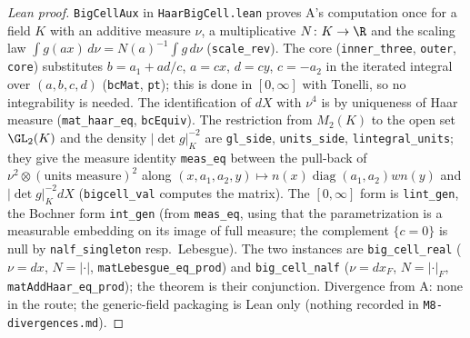 \begin{proof}[Lean proof]
\texttt{BigCellAux} in \texttt{HaarBigCell.lean} proves A's computation once for a field $K$ with an additive measure $\nu$, a multiplicative $N\colon K\to\R$ and the scaling law $\int g(ax)\,d\nu=N(a)^{-1}\int g\,d\nu$ (\texttt{scale\_rev}). The core (\texttt{inner\_three}, \texttt{outer}, \texttt{core}) substitutes $b=a_1+ad/c$, $a=cx$, $d=cy$, $c=-a_2$ in the iterated integral over $(a,b,c,d)$ (\texttt{bcMat}, \texttt{pt}); this is done in $[0,\infty]$ with Tonelli, so no integrability is needed. The identification of $dX$ with $\nu^4$ is by uniqueness of Haar measure (\texttt{mat\_haar\_eq}, \texttt{bcEquiv}). The restriction from $M_2(K)$ to the open set $\GL_2(K)$ and the density $|\det g|_K^{-2}$ are \texttt{gl\_side}, \texttt{units\_side}, \texttt{lintegral\_units}; they give the measure identity \texttt{meas\_eq} between the pull-back of $\nu^2\otimes(\text{units measure})^2$ along $(x,a_1,a_2,y)\mapsto n(x)\operatorname{diag}(a_1,a_2)wn(y)$ and $|\det g|_K^{-2}dX$ (\texttt{bigcell\_val} computes the matrix). The $[0,\infty]$ form is \texttt{lint\_gen}, the Bochner form \texttt{int\_gen} (from \texttt{meas\_eq}, using that the parametrization is a measurable embedding on its image of full measure; the complement $\{c=0\}$ is null by \texttt{nalf\_singleton} resp.\ Lebesgue). The two instances are \texttt{big\_cell\_real} ($\nu=dx$, $N=|\cdot|$, \texttt{matLebesgue\_eq\_prod}) and \texttt{big\_cell\_nalf} ($\nu=dx_F$, $N=|\cdot|_F$, \texttt{matAddHaar\_eq\_prod}); the theorem is their conjunction. Divergence from A: none in the route; the generic-field packaging is Lean only (nothing recorded in \texttt{M8-divergences.md}).
\end{proof}

